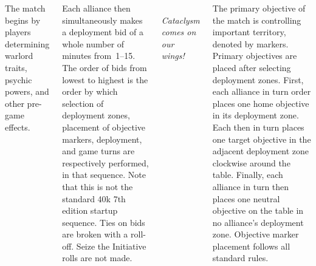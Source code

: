 \documentclass{40k}
\begin{document}
\begin{columns}
%

The match begins by players determining warlord traits, psychic
powers, and other pre-game effects.

Each alliance then simultaneously makes a deployment bid of a whole
number of minutes from~1--15.  The order of bids from lowest to
highest is the order by which selection of deployment zones, placement
of objective markers, deployment, and game turns are respectively
performed, in that sequence.  Note that this is not the standard 40k
7th edition startup sequence.  Ties on bids are broken with a
roll-off.  Seize the Initiative rolls are not made.

\columnbreak
\noindent
\begin{minipage}[h]{1.0\linewidth}\centering\small\it%
\\
Cataclysm comes on our wings!
\end{minipage}
\vfill

%

The primary objective of the match is controlling important territory,
denoted by markers.  Primary objectives are placed after selecting
deployment zones.  First, each alliance in turn order places one home
objective in its deployment zone.  Each then in turn places one target
objective in the adjacent deployment zone clockwise around the table.
Finally, each alliance in turn then places one neutral objective on
the table in no alliance's deployment zone.  Objective marker
placement follows all standard rules.


\end{columns}
\end{document}

